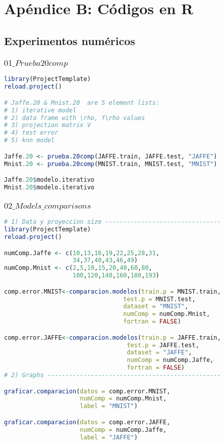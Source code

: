 \chapter{Apéndice B: Códigos en R}
\label{ch:appendixB}

\section{Experimentos numéricos}
\subsection{$01\_Prueba20comp$}

\begin{lstlisting}[language=R, basicstyle=\small]
library(ProjectTemplate)
reload.project()

# Jaffe.20 & Mnist.20  are 5 element lists:
# 1) iterative model
# 2) data frame with \rho, f\rho values
# 3) projection matrix V
# 4) test error
# 5) knn model

Jaffe.20 <- prueba.20comp(JAFFE.train, JAFFE.test, "JAFFE")
Mnist.20 <- prueba.20comp(MNIST.train, MNIST.test, "MNIST")

Jaffe.20$modelo.iterativo
Mnist.20$modelo.iterativo
\end{lstlisting}

\subsection{$02\_Models\_comparisons$}
\begin{lstlisting}[language=R, basicstyle=\small]
# 1) Data y proyeccion size --------------------------------
library(ProjectTemplate)
reload.project()

numComp.Jaffe <- c(10,13,16,19,22,25,28,31,
                   34,37,40,43,46,49) 
numComp.Mnist <- c(2,5,10,15,20,40,60,80,
                   100,120,140,160,180,193)

comp.error.MNIST<-comparacion.modelos(train.p = MNIST.train,
                                 test.p = MNIST.test, 
                                 dataset = "MNIST", 
                                 numComp = numComp.Mnist,
                                 fortran = FALSE)

comp.error.JAFFE<-comparacion.modelos(train.p = JAFFE.train,
                                  test.p = JAFFE.test, 
                                  dataset = "JAFFE", 
                                  numComp = numComp.Jaffe,
                                  fortran = FALSE)
# 2) Graphs ------------------------------------------------

graficar.comparacion(datos = comp.error.MNIST, 
                     numComp = numComp.Mnist, 
                     label = "MNIST")

graficar.comparacion(datos = comp.error.JAFFE, 
                     numComp = numComp.Jaffe, 
                     label = "JAFFE")
\end{lstlisting}

